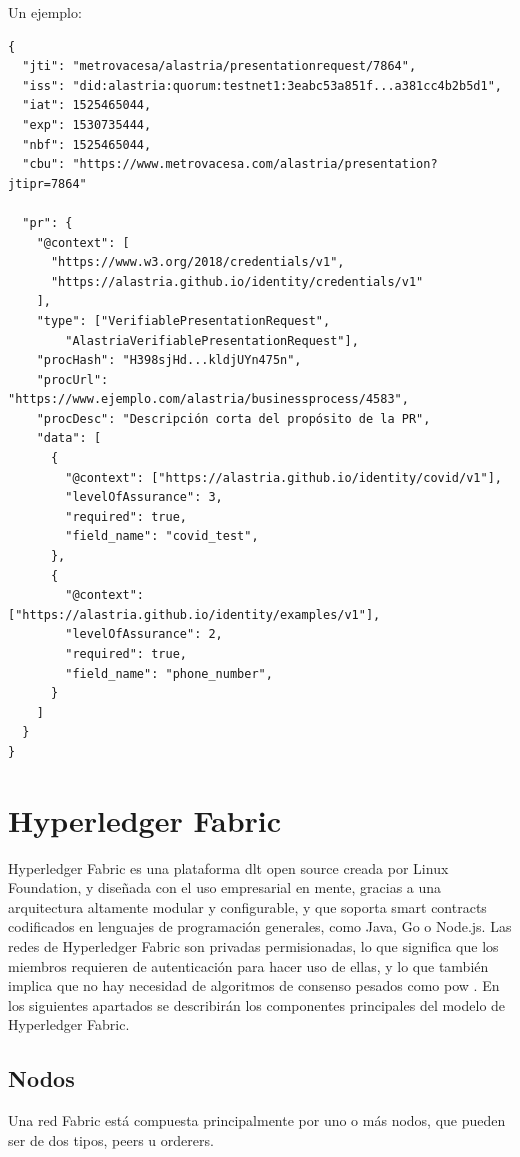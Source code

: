 Un ejemplo:
\begin{verbatim}
{
  "jti": "metrovacesa/alastria/presentationrequest/7864",
  "iss": "did:alastria:quorum:testnet1:3eabc53a851f...a381cc4b2b5d1",
  "iat": 1525465044,
  "exp": 1530735444,
  "nbf": 1525465044,
  "cbu": "https://www.metrovacesa.com/alastria/presentation?jtipr=7864"

  "pr": {
    "@context": [
      "https://www.w3.org/2018/credentials/v1",
      "https://alastria.github.io/identity/credentials/v1"
    ],
    "type": ["VerifiablePresentationRequest", 
        "AlastriaVerifiablePresentationRequest"],
    "procHash": "H398sjHd...kldjUYn475n",
    "procUrl": "https://www.ejemplo.com/alastria/businessprocess/4583",
    "procDesc": "Descripción corta del propósito de la PR",
    "data": [
      {
        "@context": ["https://alastria.github.io/identity/covid/v1"],
        "levelOfAssurance": 3,
        "required": true,
        "field_name": "covid_test",
      },
      {
        "@context": ["https://alastria.github.io/identity/examples/v1"],
        "levelOfAssurance": 2,
        "required": true,
        "field_name": "phone_number",
      }
    ]
  }
}
\end{verbatim}

\clearpage
\section{Hyperledger Fabric}
Hyperledger Fabric es una plataforma \acrshort{dlt} open source creada por Linux Foundation, y diseñada con el uso empresarial en mente, gracias a una arquitectura altamente modular y configurable, y que soporta smart contracts codificados en lenguajes de programación generales, como Java, Go o Node.js.
Las redes de Hyperledger Fabric son privadas permisionadas, lo que significa que los miembros requieren de autenticación para hacer uso de ellas, y lo que también implica que no hay necesidad de algoritmos de consenso pesados como \acrshort{pow} \cite{fabric-simple}.
En los siguientes apartados se describirán los componentes principales del modelo de Hyperledger Fabric.
\subsection{Nodos}
Una red Fabric está compuesta principalmente por uno o más nodos, que pueden ser de dos tipos, peers u orderers.
